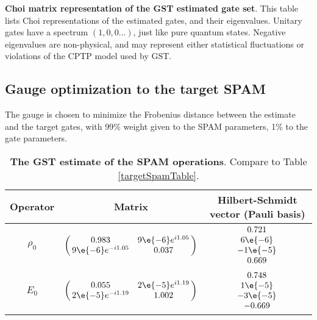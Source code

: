 {\begin{table}[h]
\begin{center}
\caption{\textbf{Choi matrix representation of the GST estimated gate set}.  This table lists Choi representations of the estimated gates, and their eigenvalues.  Unitary gates have a spectrum $(1,0,0\ldots)$, just like pure quantum states.  Negative eigenvalues are non-physical, and may represent either statistical fluctuations or violations of the CPTP model used by GST.\label{bestTargetGatesetChoiTable}}
\end{center}
\end{table}


\clearpage

\subsection{Gauge optimization to the target SPAM}
The gauge is chosen to minimize the Frobenius distance between the estimate and the target gates, with 99\% weight given to the SPAM parameters, 1\% to the gate parameters.

\begin{table}[h]
\begin{center}
\begin{tabular}[l]{|c|c|c|}
\hline
Operator & Matrix & Hilbert-Schmidt vector (Pauli basis) \\ \hline
$\rho_{0}$ & $ \left(\!\!\begin{array}{cc}
0.983 & 9\e{-6}e^{i1.05} \\ 
9\e{-6}e^{-i1.05} & 0.037
 \end{array}\!\!\right) $
 & $ \begin{array}{c}
0.721 \\ 
6\e{-6} \\ 
-1\e{-5} \\ 
0.669
 \end{array} $
 \\ \hline
$E_{0}$ & $ \left(\!\!\begin{array}{cc}
0.055 & 2\e{-5}e^{i1.19} \\ 
2\e{-5}e^{-i1.19} & 1.002
 \end{array}\!\!\right) $
 & $ \begin{array}{c}
0.748 \\ 
1\e{-5} \\ 
-3\e{-5} \\ 
-0.669
 \end{array} $
 \\ \hline
\end{tabular}

\caption{\textbf{The GST estimate of the SPAM operations}.  Compare to Table \ref{targetSpamTable}.\label{bestTargetSpamGatesetSpamTable}}
\end{center}
\end{table}

}

